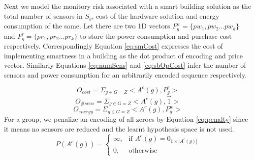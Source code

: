 Next we model the monitory risk associated with a smart building solution as the total number of sensors in $S_g$, cost of the hardware solution and energy consumption of the same.
Let there are two 1D vectors $P^w_g = \{pw_1, pw_2 \dots pw_k\}$ and $P^r_g = \{pr_1, pr_2 \dots pr_k\}$ to store the power consumption and purchase cost respectively. 
Correspondingly Equation \ref{eq:smCost} expresses the cost of implementing smartness in a building as the dot product of encoding and price vector.
Similarly Equations \ref{eq:numSens} and \ref{eq:sbOpCost} infer the number of sensors and power consumption for an arbitrarily encoded sequence respectively. 

\begin{equation}
    O_{cost}  =  \Sigma_{g \in G=Z} <A^c(g), P^r_g> 
    \label{eq:smCost}
\end{equation}
%
\begin{equation}
    O_{\# sens}  = \Sigma_{g \in G=Z} <A^c(g ), \Vec{1}>
    \label{eq:numSens}
\end{equation}
%
\begin{equation}
    O_{energy} =  \Sigma_{g \in G=Z} <A^c(g), P^w_g>
    \label{eq:sbOpCost}
\end{equation}
For a group, we penalize an encoding of all zeroes by Equation \ref{eq:penalty} since it means no sensors are reduced and the learnt hypothesis space is not used.
\begin{equation}
P (A^c(g))=  \begin{cases}
    \infty,& \text{if } A^c(g) = 0_{1 \times |A^c(g)|} \\
    0,    & \text{otherwise}
\end{cases}
\label{eq:penalty}
\end{equation}

